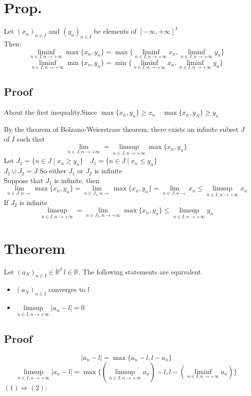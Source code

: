 \documentclass{book}
\begin{document}
\section{Prop.}
Let $(x_n)_{n\in I}$ and $(y_n)_{n\in I}$ be elements of $[-\infty,+\infty]^I$ \\
Then:
$$\liminf\limits_{n\in I,n\rightarrow+\infty}\max\{x_n,y_n\}=\max\{\liminf\limits_{n\in I,n\rightarrow+\infty}x_n,\liminf\limits_{n\in I,n\rightarrow+\infty}y_n\}$$
$$\liminf\limits_{n\in I,n\rightarrow+\infty}\min\{x_n,y_n\}=\min\{\liminf\limits_{n\in I,n\rightarrow+\infty}x_n,\liminf\limits_{n\in I,n\rightarrow+\infty}y_n\}$$
\subsection*{Proof}
About the first inequality.Since $\max\{x_n,y_n\}\geq x_n\quad \max\{x_n,y_N\}\geq y_n$

By the theorem of Bolzano-Weierstrass theorem, there exists an infinite subset $J$ of $I$ such that$$\lim\limits_{n\in J,n\rightarrow+\infty}=\limsup\limits_{n\in J,n\rightarrow+\infty}\max\{x_n,y_n\}$$
Let $J_1=\{n\in J\mid x_n\geq y_n\}\quad J_1=\{n\in J\mid x_n\leq y_n\}$\\
$J_1\cup J_2=J$ So either $J_1$ or $J_2$ is infinite\\
Suppose that $J_1$ is infinite, then
$$\lim\limits_{n\in J,n\rightarrow}\max\{x_n,y_n\}=\lim\limits_{n\in J_1,n\rightarrow}\max\{x_n,y_n\}=\lim\limits_{n\in J,n\rightarrow}x_n\leq\limsup\limits_{n\in I,n\rightarrow+\infty}x_n$$
If $J_2$ is infinite
$$\limsup\limits_{n\in I,n\rightarrow+\infty}=\lim\limits_{n\in J_2,n\rightarrow+\infty}\max\{x_n,y_n\}\leq\limsup\limits_{n\in I,n\rightarrow+\infty}y_n$$
\section{Theorem}
Let $(a_N)_{n\in I}\in \mathbb{R} ^I\ l\in\mathbb{R} $. The following statements are equivalent
\begin{itemize}
    \item $(a_N)_{n\in I}$ converges to $l$
    \item $\limsup\limits_{n\in I,n\rightarrow+\infty}\lvert a_n-l\rvert=0$
\end{itemize}
\subsection*{Proof}
$$\lvert a_n-l\rvert=\max\{a_n-l,l-a_n\}$$
$$\limsup\limits_{n\in I,n\rightarrow+\infty}\lvert a_n-l\rvert=\max\{(\limsup\limits_{n\in I,n\rightarrow+\infty}a_n)-l,l-(\liminf\limits_{n\in I,n\rightarrow+\infty}a_n)\}$$
$(1)\Rightarrow(2)$:
\end{document}
